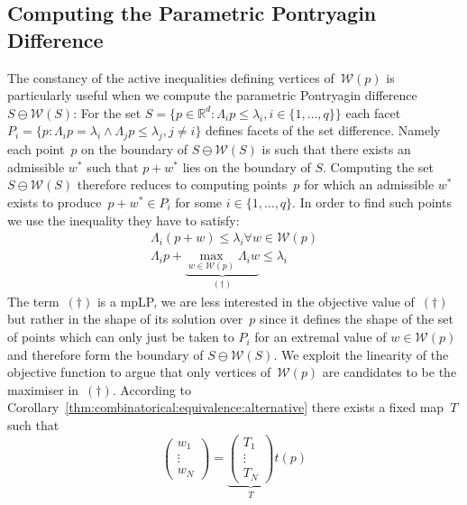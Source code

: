 \documentclass[final]{elsarticle}
\theoremstyle{remark}
\theoremstyle{definition}
\begin{document}
\subsection{Computing the Parametric Pontryagin Difference}\label{ssec:computation:p:pontryagin:difference}
%
%
%
The constancy of the active inequalities defining vertices of~$\mathcal W(p)$ is particularly useful when we compute the parametric Pontryagin difference $S\ominus\mathcal W(S)$:
%
For the set $S=\{p\in\mathbb R^d:\Lambda_i p\leq\lambda_i,i\in\{1,\dots,q\}\}$ each facet $P_i=\{p:\Lambda_i p=\lambda_i\wedge\Lambda_j p\leq\lambda_j,j\neq i\}$ defines facets of the set difference.
%
Namely each point~$p$ on the boundary of $S\ominus\mathcal W(S)$ is such that there exists an admissible $w^\ast$ such that $p+w^\ast$ lies on the boundary of $S$.
%
Computing the set $S\ominus\mathcal W(S)$ therefore reduces to computing points~$p$ for which an admissible $w^\ast$ exists to produce~$p+w^\ast\in P_i$ for some $i\in\{1,\dots,q\}$.
%
In order to find such points we use the inequality they have to satisfy:
%
\begin{equation}\begin{split}
  \Lambda_i(p+w)\leq\lambda_i\forall w\in\mathcal W(p)\\
  \Lambda_i p+\underbrace{\max_{w\in\mathcal W(p)}\Lambda_i w}_{(\dagger)}\leq\lambda_i
\end{split}\end{equation}
%
The term~$(\dagger)$ is a mpLP, we are less interested in the objective value of~$(\dagger)$ but rather in the shape of its solution over~$p$ since it defines the shape of the set of points 
which can only just be taken to $P_i$ for an extremal value of $w\in\mathcal W(p)$ and therefore form the boundary of $S\ominus \mathcal W(S)$.
%
We exploit the linearity of the objective function to argue that only vertices of~$\mathcal W(p)$ are candidates to be the maximiser in~$(\dagger)$.
%
According to Corollary~\ref{thm:combinatorical:equivalence:alternative} there exists a fixed map~$T$ such that 
%
\begin{equation}
  \begin{pmatrix}w_1\\ \vdots\\ w_N\end{pmatrix} = \underbrace{\begin{pmatrix}T_1\\ \vdots\\ T_N\end{pmatrix}}_T t(p)
\end{equation}
\end{document}
